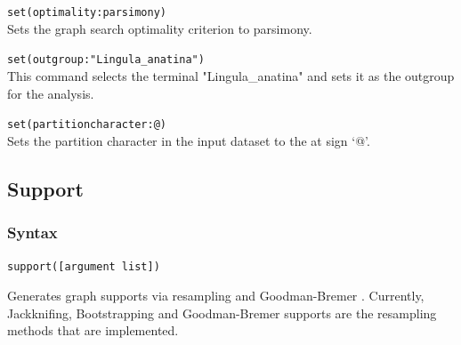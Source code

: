 	\begin{example}
		\item{\texttt{set(optimality:parsimony)}\\Sets the graph search optimality criterion to 
		parsimony.}

		\item{\texttt{set(outgroup:"Lingula\_anatina")}\\This command selects the terminal 
		"Lingula\_anatina" and sets it as the outgroup for the analysis.}
		
		\item{\texttt{set(partitioncharacter:@)}\\Sets the partition character in the input dataset 
		to the at sign `@'.}
		
	\end{example}

\subsection{Support}
\label{subsec:support}
	\subsubsection{Syntax}
		\texttt{support([argument list])}
		
	\begin{phygdescription}
		{Generates graph supports via resampling \citep{Farrisetal1996} and Goodman-Bremer 
		\citep{Goodmanetal1982, bremer1994}. Currently, Jackknifing, Bootstrapping and 
		Goodman-Bremer supports are the resampling methods that are implemented.}
	\end{phygdescription}
		
